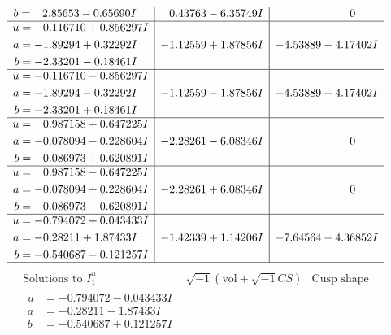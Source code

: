 \documentclass[1p]{elsarticle_modified}
\theoremstyle{definition}
\newcommand{\I}{\sqrt{-1}}
\begin{document}
$$\begin{array}{c|c|c}
\begin{aligned}
b &= \phantom{-}2.85653 - 0.65690 I\end{aligned}
 & \phantom{-}0.43763 - 6.35749 I & \phantom{-0.000000 } 0 \\ \hline\begin{aligned}
u &= -0.116710 + 0.856297 I \\
a &= -1.89294 + 0.32292 I \\
b &= -2.33201 - 0.18461 I\end{aligned}
 & -1.12559 + 1.87856 I & -4.53889 - 4.17402 I \\ \hline\begin{aligned}
u &= -0.116710 - 0.856297 I \\
a &= -1.89294 - 0.32292 I \\
b &= -2.33201 + 0.18461 I\end{aligned}
 & -1.12559 - 1.87856 I & -4.53889 + 4.17402 I \\ \hline\begin{aligned}
u &= \phantom{-}0.987158 + 0.647225 I \\
a &= -0.078094 - 0.228604 I \\
b &= -0.086973 + 0.620891 I\end{aligned}
 & -2.28261 - 6.08346 I & \phantom{-0.000000 } 0 \\ \hline\begin{aligned}
u &= \phantom{-}0.987158 - 0.647225 I \\
a &= -0.078094 + 0.228604 I \\
b &= -0.086973 - 0.620891 I\end{aligned}
 & -2.28261 + 6.08346 I & \phantom{-0.000000 } 0 \\ \hline\begin{aligned}
u &= -0.794072 + 0.043433 I \\
a &= -0.28211 + 1.87433 I \\
b &= -0.540687 - 0.121257 I\end{aligned}
 & -1.42339 + 1.14206 I & -7.64564 - 4.36852 I\\
 \hline 
 \end{array}$$\newpage$$\begin{array}{c|c|c}  
\text{Solutions to }I^u_{1}& \I (\text{vol} + \sqrt{-1}CS) & \text{Cusp shape}\\
 \hline 
\begin{aligned}
u &= -0.794072 - 0.043433 I \\
a &= -0.28211 - 1.87433 I \\
b &= -0.540687 + 0.121257 I\end{aligned}

\end{array}$$
\end{document}
